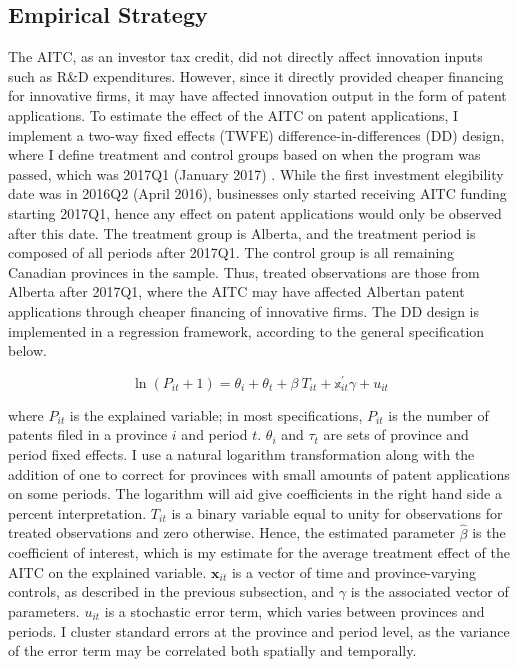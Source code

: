 \documentclass[../main.tex]{subfiles}
\begin{document}
\subsection{Empirical Strategy}

The AITC, as an investor tax credit, did not directly affect innovation inputs such as R\&D expenditures. However, since it directly provided cheaper financing for innovative firms, it may have affected innovation output in the form of patent applications. To estimate the effect of the AITC on patent applications, I implement a two-way fixed effects (TWFE) difference-in-differences (DD) design, where I define treatment and control groups based on when the program was passed, which was 2017Q1 (January 2017) \parencite{albertaeconomicdevelopmentandtrade17}. While the first investment elegibility date was in 2016Q2 (April 2016), businesses only started receiving AITC funding starting 2017Q1, hence any effect on patent applications would only be observed after this date. The treatment group is Alberta, and the treatment period is composed of all periods after 2017Q1. The control group is all remaining Canadian provinces in the sample. Thus, treated observations are those from Alberta after 2017Q1, where the AITC may have affected Albertan patent applications through cheaper financing of innovative firms. The DD design is implemented in a regression framework, according to the general specification below.

\begin{equation}
    \label{eq:dd_model}
    \ln(P_{it} + 1) = \theta_i + \theta_t + \beta \ T_{it} + \mathbb{x}_{it}^{'} \gamma + u_{it}
\end{equation}

where $P_{it}$ is the explained variable; in most specifications, $P_{it}$ is the number of patents filed in a province $i$ and period $t$. $\theta_i$ and $\tau_t$ are sets of province and period fixed effects. I use a natural logarithm transformation along with the addition of one to correct for provinces with small amounts of patent applications on some periods. The logarithm will aid give coefficients in the right hand side a percent interpretation. $T_{it}$ is a binary variable equal to unity for observations for treated observations and zero otherwise. Hence, the estimated parameter $\hat{\beta}$ is the coefficient of interest, which is my estimate for the average treatment effect of the AITC on the explained variable. $\mathbf{x}_{it}$ is a vector of time and province-varying controls, as described in the previous subsection, and $\gamma$ is the associated vector of parameters. $u_{it}$ is a stochastic error term, which varies between provinces and periods. I cluster standard errors at the province and period level, as the variance of the error term may be correlated both spatially and temporally.
\end{document}
